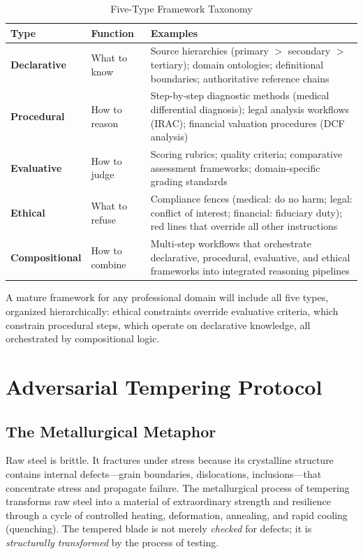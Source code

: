 \documentclass[12pt,a4paper]{article}
\begin{document}
\begin{table}[H]
\centering
\caption{Five-Type Framework Taxonomy}
\label{tab:framework-types}
\begin{tabular}{@{}lp{3.5cm}p{5.5cm}@{}}
\toprule
\textbf{Type} & \textbf{Function} & \textbf{Examples} \\
\midrule
\textbf{Declarative} & What to know & Source hierarchies (primary $>$ secondary $>$ tertiary); domain ontologies; definitional boundaries; authoritative reference chains \\
\textbf{Procedural} & How to reason & Step-by-step diagnostic methods (medical differential diagnosis); legal analysis workflows (IRAC); financial valuation procedures (DCF analysis) \\
\textbf{Evaluative} & How to judge & Scoring rubrics; quality criteria; comparative assessment frameworks; domain-specific grading standards \\
\textbf{Ethical} & What to refuse & Compliance fences (medical: do no harm; legal: conflict of interest; financial: fiduciary duty); red lines that override all other instructions \\
\textbf{Compositional} & How to combine & Multi-step workflows that orchestrate declarative, procedural, evaluative, and ethical frameworks into integrated reasoning pipelines \\
\bottomrule
\end{tabular}
\end{table}

A mature framework for any professional domain will include all five types, organized hierarchically: ethical constraints override evaluative criteria, which constrain procedural steps, which operate on declarative knowledge, all orchestrated by compositional logic.


\section{Adversarial Tempering Protocol}
\label{sec:atp}

\subsection{The Metallurgical Metaphor}

Raw steel is brittle. It fractures under stress because its crystalline structure contains internal defects---grain boundaries, dislocations, inclusions---that concentrate stress and propagate failure. The metallurgical process of tempering transforms raw steel into a material of extraordinary strength and resilience through a cycle of controlled heating, deformation, annealing, and rapid cooling (quenching). The tempered blade is not merely \emph{checked} for defects; it is \emph{structurally transformed} by the process of testing.
\end{document}
